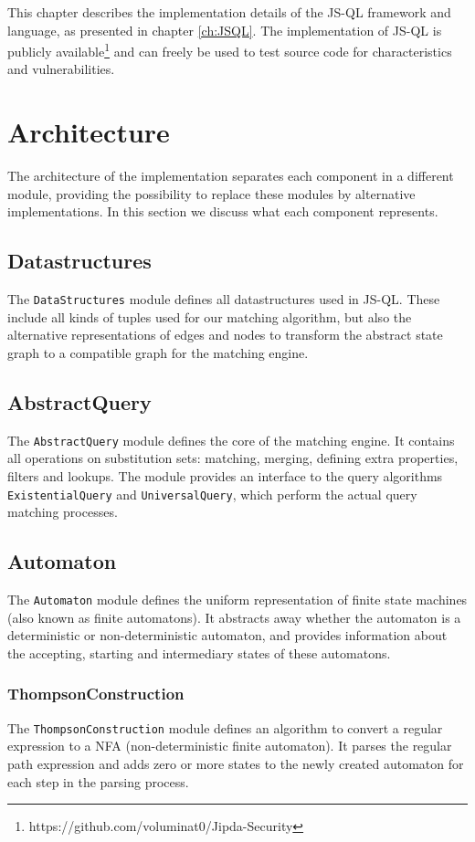 This chapter describes the implementation details of the JS-QL framework and language, as presented in chapter \ref{ch:JSQL}. The implementation of JS-QL is publicly available\footnote{https://github.com/voluminat0/Jipda-Security} and can freely be used to test source code for characteristics and vulnerabilities.


\section{Architecture}
The architecture of the implementation separates each component in a different module, providing the possibility to replace these modules by alternative implementations. In this section we discuss what each component represents.

\subsection*{Datastructures}
The \texttt{DataStructures} module defines all datastructures used in JS-QL. These include all kinds of tuples used for our matching algorithm, but also the alternative representations of edges and nodes to transform the abstract state graph to a compatible graph for the matching engine.

\subsection*{AbstractQuery}
The \texttt{AbstractQuery} module defines the core of the matching engine. It contains all operations on substitution sets: matching, merging, defining extra properties, filters and lookups. The module provides an interface to the query algorithms \texttt{ExistentialQuery} and \texttt{UniversalQuery}, which perform the actual query matching processes.

\subsection*{Automaton}
The \texttt{Automaton} module defines the uniform representation of finite state machines (also known as finite automatons). It abstracts away whether the automaton is a deterministic or non-deterministic automaton, and provides information about the accepting, starting and intermediary states of these automatons.

\subsubsection*{ThompsonConstruction}
The \texttt{ThompsonConstruction} module defines an algorithm to convert a regular expression to a NFA (non-deterministic finite automaton). It parses the regular path expression and adds zero or more states to the newly created automaton for each step in the parsing process.
